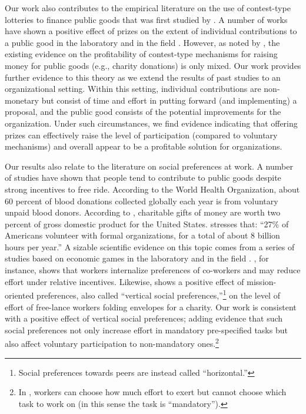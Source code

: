 \documentclass[11pt, titlepage]{article}
\begin{document}
Our work also contributes to the empirical literature on the use of
contest-type lotteries to finance public goods that was first studied by
\citet{morgan2000financing}. A number of works have shown a positive
effect of prizes on the extent of individual contributions to a public
good in the laboratory
\citep{morgan2000funding, dale2004charitable, lange2007using} and in the
field \citep{landry2006toward}. However, as noted by
\citet{vesterlund2012voluntary}, the existing evidence on the
profitability of contest-type mechanisms for raising money for public
goods (e.g., charity donations) is only mixed. Our work provides further
evidence to this theory as we extend the results of past studies to an
organizational setting. Within this setting, individual contributions
are non-monetary but consist of time and effort in putting forward (and
implementing) a proposal, and the public good consists of the potential
improvements for the organization. Under such circumstances, we find
evidence indicating that offering prizes can effectively raise the level
of participation (compared to voluntary mechanisms) and overall appear
to be a profitable solution for organizations.

Our results also relate to the literature on social preferences at work.
A number of studies have shown that people tend to contribute to public
goods despite strong incentives to free ride. According to the World
Health Organization, about 60 percent of blood donations collected
globally each year is from voluntary unpaid blood donors. According to
\citet{list2011market}, charitable gifts of money are worth two percent
of gross domestic product for the United States.
\citet{lacetera2014rewarding} stresses that: ``27\% of Americans
volunteer with formal organizations, for a total of about 8 billion
hours per year.'' A sizable scientific evidence on this topic comes from
a series of studies based on economic games in the laboratory
\citep[see][ for a review]{levitt2007laboratory} and in the field
\citep{bandiera2005social, dellavigna2016estimating}.
\citet{bandiera2005social}, for instance, shows that workers internalize
preferences of co-workers and may reduce effort under relative
incentives. Likewise, \citet{dellavigna2016estimating} shows a positive
effect of mission-oriented preferences, also called ``vertical social
preferences,''\footnote{Social preferences towards peers are instead
  called ``horizontal.''} on the level of effort of free-lance workers
folding envelopes for a charity. Our work is consistent with a positive
effect of vertical social preferences; adding evidence that such social
preferences not only increase effort in mandatory pre-specified tasks
but also affect voluntary participation to non-mandatory ones.\footnote{In
  \citet{dellavigna2016estimating}, workers can choose how much effort
  to exert but cannot choose which task to work on (in this sense the
  task is ``mandatory'').}
\end{document}
